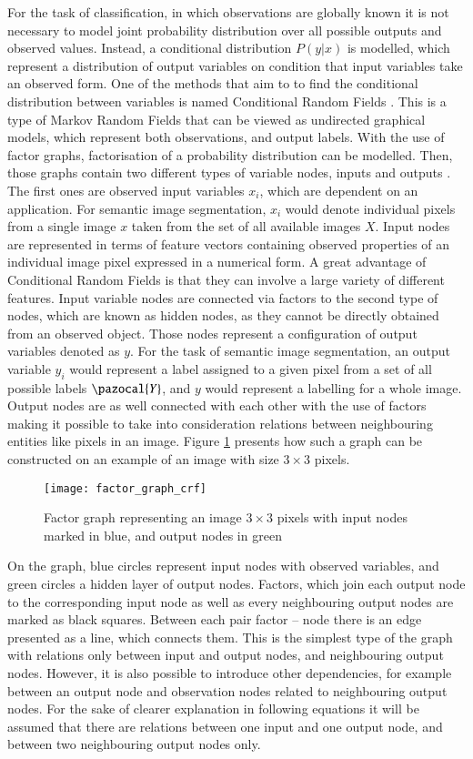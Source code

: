 For the task of classification, in which observations are globally known it is not necessary to model joint probability distribution over all possible outputs and observed values. Instead, a conditional distribution $P(y|x)$ is modelled, which represent a distribution of output variables on condition that input variables take an observed form. One of the methods that aim to to find the conditional distribution between variables is named Conditional Random Fields \cite{crf_lafferty}. This is a type of Markov Random Fields that can be viewed as undirected graphical models, which represent both observations, and output labels. With the use of factor graphs, factorisation of a probability distribution can be modelled. Then, those graphs contain two different types of variable nodes, inputs and outputs \cite{crf_sutton}. The first ones are observed input variables $x_i$, which are dependent on an application. For semantic image segmentation, $x_i$ would denote individual pixels from a single image $x$ taken from the set of all available images $X$. Input nodes are represented in terms of feature vectors containing observed properties of an individual image pixel expressed in a numerical form. A great advantage of Conditional Random Fields is that they can involve a large variety of different features. Input variable nodes are connected via factors to the second type of nodes, which are known as hidden nodes, as they cannot be directly obtained from an observed object. Those nodes represent a configuration of output variables denoted as $y$. For the task of semantic image segmentation, an output variable $y_i$ would represent a label assigned to a given pixel from a set of all possible labels $\pazocal{Y}$, and $y$ would represent a labelling for a whole image. Output nodes are as well connected with each other with the use of factors making it possible to take into consideration relations between neighbouring entities like pixels in an image. Figure \ref{fig:factor_graph_crf} presents how such a graph can be constructed on an example of an image with size $3\times3$ pixels.
\begin{figure}[ht]
    \centering
    \texttt{[image: factor\_graph\_crf]}
    \caption{Factor graph representing an image $3\times3$ pixels with input nodes marked in blue, and output nodes in green}
     \label{fig:factor_graph_crf}
\end{figure}

On the graph, blue circles represent input nodes with observed variables, and green circles a hidden layer of output nodes. Factors, which join each output node to the corresponding input node as well as every neighbouring output nodes are marked as black squares. Between each pair factor – node there is an edge presented as a line, which connects them. This is the simplest type of the graph with relations only between input and output nodes, and neighbouring output nodes. However, it is also possible to introduce other dependencies, for example between an output node and observation nodes related to neighbouring output nodes. For the sake of clearer explanation in following equations it will be assumed that there are relations between one input and one output node, and between two neighbouring output nodes only.

